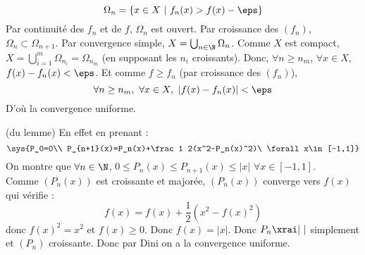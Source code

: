 \prvv
$$\Omega_n=\{x\in X\ |\ f_n(x)>f(x)-\eps\}$$
Par continuité des $f_n$ et de $f$, $\Omega_n$ est ouvert. Par croissance des $(f_n)$, $\Omega_n\subset\Omega_{n+1}$. Par convergence simple, $X=\bigcup_{n\in\N}\Omega_n$. Comme $X$ est compact, $X=\bigcup_{i=1}^m\Omega_{n_i}=\Omega_{n_m}$ (en supposant les $n_i$ croissants).
\dl Donc, $\forall n\ge n_m$, $\forall x\in X$, $f(x)-f_n(x)<\eps$. Et comme $f\ge f_n$ (par croissance des $(f_n)$),
$$\forall n\ge n_m,\ \forall x\in X,\ |f(x)-f_n(x)|<\eps$$
D'où la convergence uniforme.
\prvf


\prv (du lemme)\dl
En effet en prenant :
$$\sys{P_0=0\\ P_{n+1}(x)=P_n(x)+\frac 1 2(x^2-P_n(x)^2)\ \forall x\in[-1,1]}$$
On montre que $\forall n\in\N$, $0\le P_n(x)\le P_{n+1}(x)\le|x|$ $\forall x\in[-1,1]$.
\\ Comme $(P_n(x))$ est croissante et majorée, $(P_n(x))$ converge vers $f(x)$ qui vérifie :
$$f(x)=f(x)+\frac{1}{2}(x^2-f(x)^2)$$
donc $f(x)^2=x^2$ et $f(x)\ge 0$. Donc $f(x)=|x|$. Donc $P_n\xrai|\ |$ simplement et $(P_n)$ croissante. Donc par Dini on a la convergence uniforme.
\prvf

